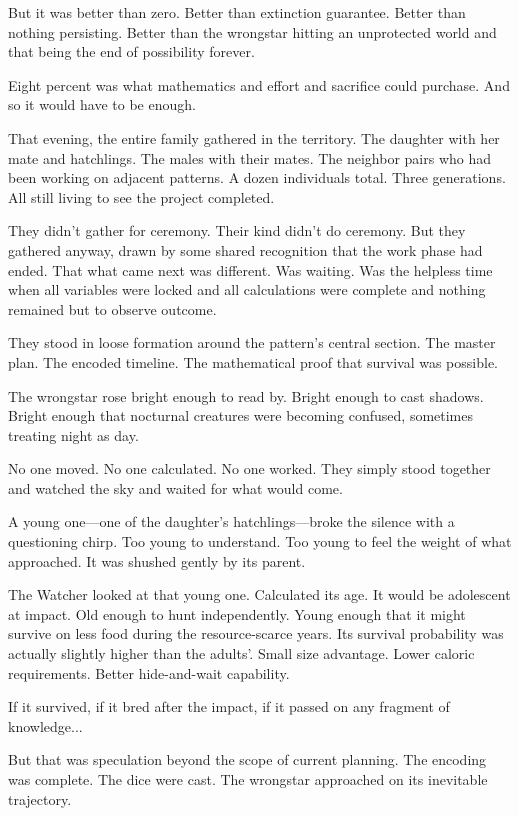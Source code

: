 But it was better than zero. Better than extinction guarantee. Better than nothing persisting. Better than the wrongstar hitting an unprotected world and that being the end of possibility forever.

Eight percent was what mathematics and effort and sacrifice could purchase. And so it would have to be enough.

\scenebreak

That evening, the entire family gathered in the territory. The daughter with her mate and hatchlings. The males with their mates. The neighbor pairs who had been working on adjacent patterns. A dozen individuals total. Three generations. All still living to see the project completed.

They didn't gather for ceremony. Their kind didn't do ceremony. But they gathered anyway, drawn by some shared recognition that the work phase had ended. That what came next was different. Was waiting. Was the helpless time when all variables were locked and all calculations were complete and nothing remained but to observe outcome.

They stood in loose formation around the pattern's central section. The master plan. The encoded timeline. The mathematical proof that survival was possible.

The wrongstar rose bright enough to read by. Bright enough to cast shadows. Bright enough that nocturnal creatures were becoming confused, sometimes treating night as day.

No one moved. No one calculated. No one worked. They simply stood together and watched the sky and waited for what would come.

A young one—one of the daughter's hatchlings—broke the silence with a questioning chirp. Too young to understand. Too young to feel the weight of what approached. It was shushed gently by its parent.

The Watcher looked at that young one. Calculated its age. It would be adolescent at impact. Old enough to hunt independently. Young enough that it might survive on less food during the resource-scarce years. Its survival probability was actually slightly higher than the adults'. Small size advantage. Lower caloric requirements. Better hide-and-wait capability.

If it survived, if it bred after the impact, if it passed on any fragment of knowledge...

But that was speculation beyond the scope of current planning. The encoding was complete. The dice were cast. The wrongstar approached on its inevitable trajectory.

